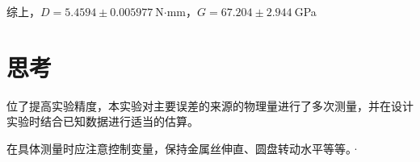 \documentclass[a4paper]{article}%
\begin{document}
综上，$D=5.4594\pm 0.005977~$N$\cdot$mm，$G=67.204\pm 2.944~$GPa

\section{思考}
位了提高实验精度，本实验对主要误差的来源的物理量进行了多次测量，并在设计实验时结合已知数据进行适当的估算。

在具体测量时应注意控制变量，保持金属丝伸直、圆盘转动水平等等。·
\end{document}
